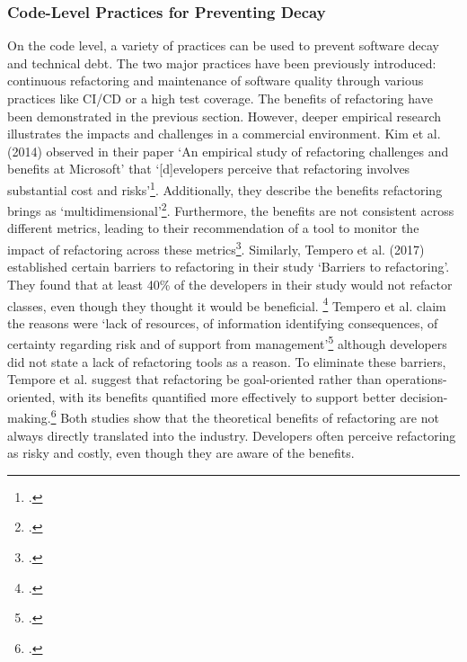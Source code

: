 \subsubsection{Code-Level Practices for Preventing Decay}
On the code level, a variety of practices can be used to prevent software decay and technical debt. The two major practices have been previously introduced: continuous refactoring and maintenance of software quality through various practices like CI/CD or a high test coverage.
The benefits of refactoring have been demonstrated in the previous section. However, deeper empirical research illustrates the impacts and challenges in a commercial environment.
Kim et al. (2014) observed in their paper `An empirical study of refactoring challenges and benefits at Microsoft' that `[d]evelopers perceive that refactoring involves substantial cost and risks'\footcite[17]{kimEmpiricalStudyRefactoring2014}.
Additionally, they describe the benefits refactoring brings as `multidimensional'\footcite[17]{kimEmpiricalStudyRefactoring2014}. Furthermore, the benefits are not consistent across different metrics, leading to their recommendation of a tool to monitor the impact of refactoring across these metrics\footcite[17]{kimEmpiricalStudyRefactoring2014}.
Similarly, Tempero et al. (2017) established certain barriers to refactoring in their study `Barriers to refactoring'. They found that at least 40\% of the developers in their study would not refactor classes, even though they thought it would be beneficial. \footcite[60]{temperoBarriersRefactoring2017}
Tempero et al. claim the reasons were `lack of resources, of information identifying consequences, of certainty regarding risk and of support from management'\footcite[60]{temperoBarriersRefactoring2017} although developers did not state a lack of refactoring tools as a reason.
To eliminate these barriers, Tempore et al. suggest that refactoring be goal-oriented rather than operations-oriented, with its benefits quantified more effectively to support better decision-making.\footcite[61]{temperoBarriersRefactoring2017}
Both studies show that the theoretical benefits of refactoring are not always directly translated into the industry. Developers often perceive refactoring as risky and costly, even though they are aware of the benefits.

